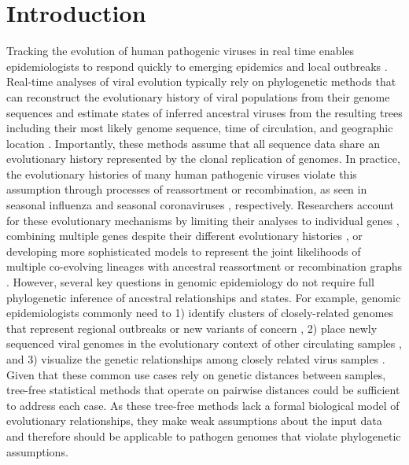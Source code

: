 \documentclass[10pt,letterpaper]{article}
\begin{document}
\linenumbers

\section*{Introduction}

Tracking the evolution of human pathogenic viruses in real time enables epidemiologists to respond quickly to emerging epidemics and local outbreaks \cite{Grubaugh2019}.
Real-time analyses of viral evolution typically rely on phylogenetic methods that can reconstruct the evolutionary history of viral populations from their genome sequences and estimate states of inferred ancestral viruses from the resulting trees including their most likely genome sequence, time of circulation, and geographic location \cite{Volz2013,Baele2017,Sagulenko2018}.
Importantly, these methods assume that all sequence data share an evolutionary history represented by the clonal replication of genomes.
In practice, the evolutionary histories of many human pathogenic viruses violate this assumption through processes of reassortment or recombination, as seen in seasonal influenza \cite{Nelson2008,Marshall2013} and seasonal coronaviruses \cite{Su2016}, respectively.
Researchers account for these evolutionary mechanisms by limiting their analyses to individual genes \cite{Lemey2007,Bhatt2011}, combining multiple genes despite their different evolutionary histories \cite{Wiens1998}, or developing more sophisticated models to represent the joint likelihoods of multiple co-evolving lineages with ancestral reassortment or recombination graphs \cite{Barrat-Charlaix2022,Muller2022}.
However, several key questions in genomic epidemiology do not require full phylogenetic inference of ancestral relationships and states.
For example, genomic epidemiologists commonly need to 1) identify clusters of closely-related genomes that represent regional outbreaks or new variants of concern \cite{OToole2022,McBroome2022,Stoddard2022,Tran-Kiem2023}, 2) place newly sequenced viral genomes in the evolutionary context of other circulating samples \cite{OToole2021,Turakhia2021,Aksamentov2021}, and 3) visualize the genetic relationships among closely related virus samples \cite{Argimon2016,Campbell2021}.
Given that these common use cases rely on genetic distances between samples, tree-free statistical methods that operate on pairwise distances could be sufficient to address each case.
As these tree-free methods lack a formal biological model of evolutionary relationships, they make weak assumptions about the input data and therefore should be applicable to pathogen genomes that violate phylogenetic assumptions.
\end{document}

